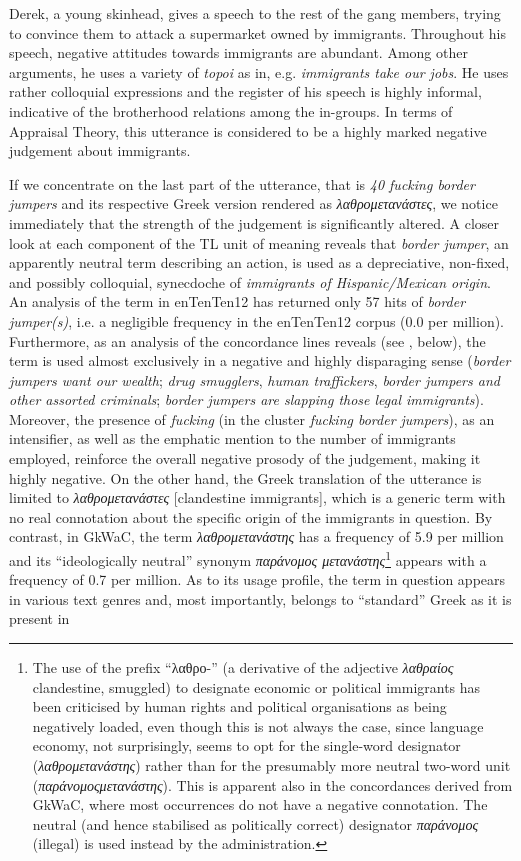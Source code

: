 \documentclass[output=paper]{LSP/langsci}
\begin{document}
Derek, a young skinhead, gives a speech to the rest of the gang members, trying to convince them to attack a supermarket owned by immigrants. Throughout his speech, negative attitudes towards immigrants are abundant. Among other arguments, he uses a variety of \textit{topoi} as in, e.g. \textit{immigrants take our jobs}. He uses rather colloquial expressions and the register of his speech is highly informal, indicative of the brotherhood relations among the in-groups. In terms of Appraisal Theory, this utterance is considered to be a highly marked negative judgement about immigrants.

If we concentrate on the last part of the utterance, that is \textit{40 fucking border jumpers} and its respective Greek version rendered as\textit{ λαθρομετανάστες}, we notice immediately that the strength of the judgement is significantly altered. A closer look at each component of the TL unit of meaning reveals that \textit{border jumper}, an apparently neutral term describing an action, is used as a depreciative, non-fixed, and possibly colloquial, synecdoche of \textit{immigrants of Hispanic/Mexican origin}. An analysis of the term in enTenTen12 has returned only 57 hits of \textit{border jumper(s)}, i.e. a negligible frequency in the enTenTen12 corpus (0.0 per million). Furthermore, as an analysis of the concordance lines reveals (see , below), the term is used almost exclusively in a negative and highly disparaging sense (\textit{border jumpers want our wealth}; \textit{drug smugglers}, \textit{human traffickers}, \textit{border jumpers and other assorted criminals}; \textit{border jumpers are slapping those legal immigrants}). Moreover, the presence of \textit{fucking} (in the cluster \textit{fucking border jumpers}), as an intensifier, as well as the emphatic mention to the number of immigrants employed, reinforce the overall negative prosody of the judgement, making it highly negative. On the other hand, the Greek translation of the utterance is limited to \textit{λαθρομετανάστες} [clandestine immigrants], which is a generic term with no real connotation about the specific origin of the immigrants in question. By contrast, in GkWaC, the term \textit{λαθρομετανάστης} has a frequency of 5.9 per million and its “ideologically neutral” synonym \textit{παράνομος μετανάστης}\footnote{The use of the prefix “λαθρο-” (a derivative of the adjective \textit{λαθραίος} {clandestine, smuggled}) to designate economic or political immigrants has been criticised by human rights and political organisations as being negatively loaded, even though this is not always the case, since language economy, not surprisingly, seems to opt for the single-word designator (\textit{λαθρομετανάστης}) rather than for the presumably more neutral two-word unit (\textit{παράνομοςμετανάστης}). This is apparent also in the concordances derived from GkWaC, where most occurrences do not have a negative connotation. The neutral (and hence stabilised as politically correct) designator \textit{παράνομος} (illegal) is used instead by the administration.} appears with a frequency of 0.7 per million. As to its usage profile, the term in question appears in various text genres and, most importantly, belongs to “standard” Greek as it is present in 
\end{document}
